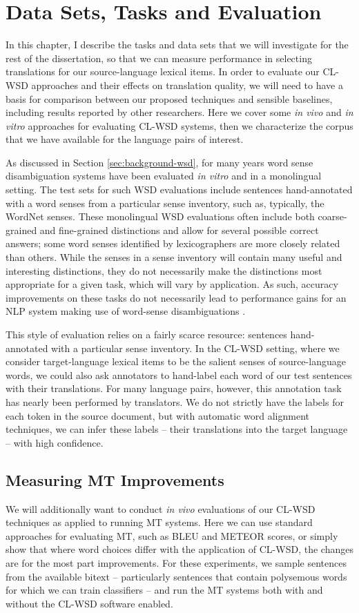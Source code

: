 \chapter{Data Sets, Tasks and Evaluation}
\label{chap:evaluation}
In this chapter, I describe the tasks and data sets that we will investigate
for the rest of the dissertation, so that we can measure performance in
selecting translations for our source-language lexical items.
In order to evaluate our CL-WSD approaches and their effects on translation
quality, we will need to have a basis for comparison between our proposed
techniques and sensible baselines, including results reported by other
researchers. Here we cover some \emph{in vivo} and \emph{in vitro} approaches
for evaluating CL-WSD systems, then we characterize the corpus that we have
available for the language pairs of interest.

As discussed in Section \ref{sec:background-wsd}, for many years word sense
disambiguation systems have been evaluated \emph{in vitro} and in a monolingual
setting. The test sets for such WSD evaluations include sentences
hand-annotated with a word senses from a particular sense inventory, such as,
typically, the WordNet senses. These monolingual WSD evaluations often include
both coarse-grained and fine-grained distinctions and allow for several
possible correct answers; some word senses identified by lexicographers are
more closely related than others.  While the senses in a sense inventory will
contain many useful and interesting distinctions, they do not necessarily make
the distinctions most appropriate for a given task, which will vary by
application. As such, accuracy improvements on these tasks do not necessarily
lead to performance gains for an NLP system making use of word-sense
disambiguations \cite{resnikwsdapplications}.

This style of evaluation relies on a fairly scarce resource: sentences
hand-annotated with a particular sense inventory.
In the CL-WSD setting, where we consider target-language lexical items to be
the salient senses of source-language words, we could also ask annotators to
hand-label each word of our test sentences with their translations.
For many language pairs, however, this annotation task has nearly been
performed by translators. We do not strictly have the labels for each token in
the source document, but with automatic word alignment techniques, we can infer
these labels -- their translations into the target language -- with high
confidence.

\section{Measuring MT Improvements}
We will additionally want to conduct \emph{in vivo} evaluations of our CL-WSD
techniques as applied to running MT systems. Here we can use standard
approaches for evaluating MT, such as BLEU and METEOR scores, or simply show
that where word choices differ with the application of CL-WSD, the changes are
for the most part improvements. For these experiments, we sample sentences
from the available bitext -- particularly sentences that contain polysemous
words for which we can train classifiers -- and run the MT systems both with
and without the CL-WSD software enabled.

